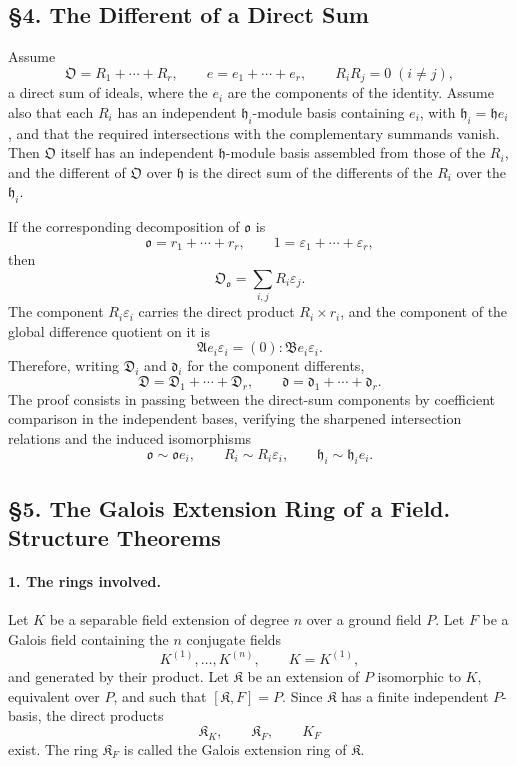 \documentclass[11pt]{article}
\begin{document}
\subsection*{§4. The Different of a Direct Sum}

Assume
\[
        \mathfrak O=R_1+\cdots+R_r,
        \qquad
        e=e_1+\cdots+e_r,
        \qquad
        R_iR_j=0\;(i\ne j),
\]
a direct sum of ideals, where the $e_i$ are the components of the identity. Assume also that each $R_i$ has an independent $\mathfrak h_i$-module basis containing $e_i$, with $\mathfrak h_i=\mathfrak h e_i$, and that the required intersections with the complementary summands vanish. Then $\mathfrak O$ itself has an independent $\mathfrak h$-module basis assembled from those of the $R_i$, and the different of $\mathfrak O$ over $\mathfrak h$ is the direct sum of the differents of the $R_i$ over the $\mathfrak h_i$.

If the corresponding decomposition of $\mathfrak o$ is
\[
        \mathfrak o=r_1+
        \cdots+r_r,
        \qquad
        1=\varepsilon_1+
        \cdots+\varepsilon_r,
\]
then
\[
        \mathfrak O_{\mathfrak o}=\sum_{i,j}R_i\varepsilon_j.
\]
The component $R_i\varepsilon_i$ carries the direct product $R_i\times r_i$, and the component of the global difference quotient on it is
\[
        \mathfrak A e_i\varepsilon_i=(0):\mathfrak B e_i\varepsilon_i.
\]
Therefore, writing $\mathfrak D_i$ and $\mathfrak d_i$ for the component differents,
\[
        \mathfrak D=\mathfrak D_1+
        \cdots+\mathfrak D_r,
        \qquad
        \mathfrak d=\mathfrak d_1+
        \cdots+\mathfrak d_r.
\]
The proof consists in passing between the direct-sum components by coefficient comparison in the independent bases, verifying the sharpened intersection relations and the induced isomorphisms
\[
        \mathfrak o\sim\mathfrak o e_i,
        \qquad
        R_i\sim R_i\varepsilon_i,
        \qquad
        \mathfrak h_i\sim \mathfrak h_i e_i.
\]

\subsection*{§5. The Galois Extension Ring of a Field. Structure Theorems}

\paragraph{1. The rings involved.}
Let $K$ be a separable field extension of degree $n$ over a ground field $P$. Let $F$ be a Galois field containing the $n$ conjugate fields
\[
        K^{(1)},\ldots,K^{(n)},
        \qquad K=K^{(1)},
\]
and generated by their product. Let $\mathfrak K$ be an extension of $P$ isomorphic to $K$, equivalent over $P$, and such that $[\mathfrak K,F]=P$. Since $\mathfrak K$ has a finite independent $P$-basis, the direct products
\[
        \mathfrak K_K,
        \qquad \mathfrak K_F,
        \qquad K_F
\]
exist. The ring $\mathfrak K_F$ is called the Galois extension ring of $\mathfrak K$.
\end{document}
